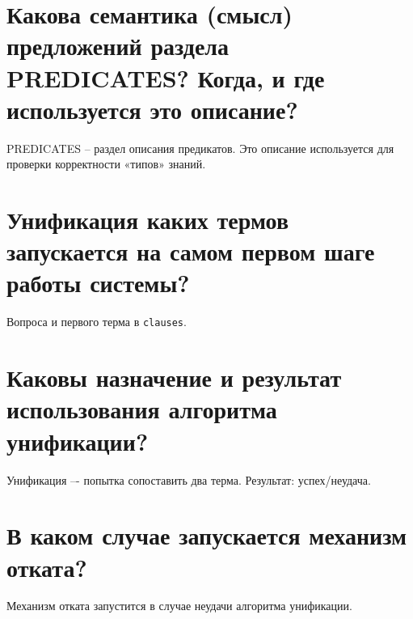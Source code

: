 \section{Какова семантика (смысл) предложений раздела PREDICATES? Когда, и где используется это описание?}
PREDICATES -- раздел описания предикатов. Это описание используется для
проверки корректности «типов» знаний.

\section{Унификация каких термов запускается на самом первом шаге работы
системы?}

Вопроса и первого терма в \texttt{clauses}.

\section{Каковы назначение и результат использования алгоритма унификации?}

Унификация –- попытка сопоставить два терма. Результат: успех/неудача.

\section{В каком случае запускается механизм отката?}

Механизм отката запустится в случае неудачи алгоритма унификации.